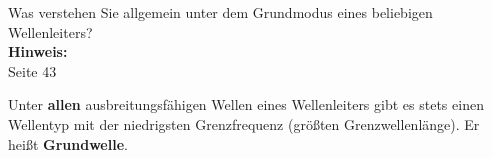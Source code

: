 \begin{question}[section=4,name={Grundmodus allgemein},difficulty=,quantity=5,type=thr,tags={20151210,20060816}]
	Was verstehen Sie allgemein unter dem Grundmodus eines beliebigen Wellenleiters?
	\\ \textbf{Hinweis:}\\
	Seite 43
\end{question}
\begin{solution}
	Unter \textbf{allen} ausbreitungsfähigen Wellen eines Wellenleiters gibt es stets einen Wellentyp mit der niedrigsten Grenzfrequenz (größten Grenzwellenlänge). Er heißt \textbf{Grundwelle}.
\end{solution}
